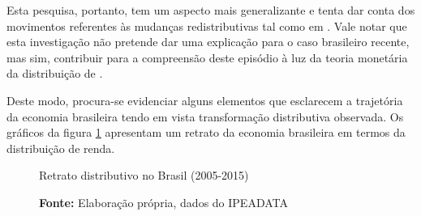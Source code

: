 Esta pesquisa, portanto, tem um aspecto mais generalizante e tenta dar conta dos movimentos referentes às mudanças redistributivas tal como em \textcite{serrano_conflito_2018}. Vale notar que esta investigação não pretende dar uma explicação para o caso brasileiro recente, mas sim, contribuir para a compreensão deste episódio à luz da teoria monetária da distribuição de \textcite{pivetti_essay_1992}.

Deste modo, procura-se evidenciar alguns elementos que esclarecem a trajetória da economia brasileira tendo em vista transformação distributiva observada. Os gráficos da figura \ref{Distri} apresentam um retrato da economia brasileira em termos da distribuição de renda.


\begin{figure}[H] %
	\begin{center}
	\caption{Retrato distributivo no Brasil (2005-2015)}
	\label{Distri}
	\end{center}
\caption*{\textbf{Fonte:} Elaboração própria, dados do IPEADATA}
\end{figure} %

